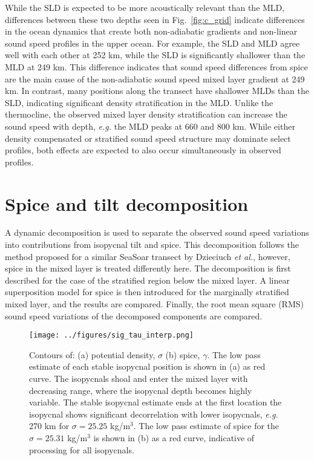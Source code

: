 \documentclass[preprint,NumberedRefs]{JASA}
\begin{document}
While the SLD is expected to be more acoustically relevant than the MLD, differences between these two depths seen in Fig.~\ref{fig:c_grid} indicate differences in the ocean dynamics that create both non-adiabatic gradients and non-linear sound speed profiles in the upper ocean. For example, the SLD and MLD agree well with each other at 252 km, while the SLD is significantly shallower than the MLD at 249 km. This difference indicates that sound speed differences from spice are the main cause of the non-adiabatic sound speed mixed layer gradient at 249 km. In contrast, many positions along the transect have shallower MLDs than the SLD, indicating significant density stratification in the MLD. Unlike the thermocline, the observed mixed layer density stratification can increase the sound speed with depth, \emph{e.g.} the MLD peaks at 660 and 800 km. While either density compensated or stratified sound speed structure may dominate select profiles, both effects are expected to also occur simultaneously in observed profiles.

\section{\label{sec:decomposition}Spice and tilt decomposition}
A dynamic decomposition is used to separate the observed sound speed variations into contributions from isopycnal tilt and spice. This decomposition follows the method proposed for a similar SeaSoar transect by Dzieciuch \emph{et al.},\citep{dzieciuch2004} however, spice in the mixed layer is treated differently here. The decomposition is first described for the case of the stratified region below the mixed layer. A linear superposition model for spice is then introduced for the marginally stratified mixed layer, and the results are compared. Finally, the root mean square (RMS) sound speed variations of the decomposed components are compared.

\begin{figure}
\texttt{[image: ../figures/sig\_tau\_interp.png]}
    \caption{\label{fig:cntrs}{Contours of: (a) potential density, $\sigma$ (b) spice, $\gamma$. The low pass estimate of each stable isopycnal position is shown in (a) as red curve. The isopycnals shoal and enter the mixed layer with decreasing range, where the isopycnal depth becomes highly variable. The stable isopycnal estimate ends at the first location the isopycnal shows significant decorrelation with lower isopycnals, \emph{e.g.} 270 km for $\sigma=25.25$ kg/m$^3$. The low pass estimate of spice for the $\sigma=25.31$ kg/m$^3$ is shown in (b) as a red curve, indicative of processing for all isopycnals.}}
\end{figure}
\end{document}
